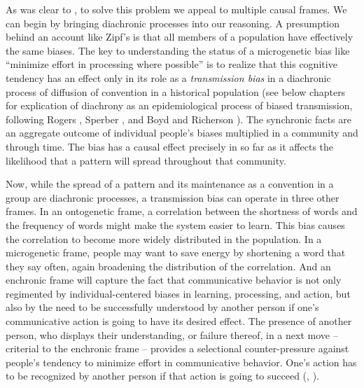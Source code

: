 As was clear to \citet{zipf_human_1949}, to solve this problem we appeal to 
multiple causal frames. We can begin by bringing diachronic processes 
into our reasoning. A presumption behind an account like Zipf's is 
that all members of a population have effectively the same biases. The key to understanding the status of a microgenetic bias like 
``minimize effort in processing where possible'' is to realize that this 
cognitive tendency has an effect only in its role as a \textit{transmission bias} in a diachronic process of diffusion of convention 
in a historical population (see below chapters for explication of 
diachrony as an epidemiological process of biased transmission, 
following Rogers \citeyear{rogers_diffusion_2003}, Sperber \citeyear{sperber_anthropology_1985}, and Boyd and Richerson \citeyear{boyd_culture_1985,boyd_origin_2005}). The synchronic facts are an aggregate outcome of individual people's biases multiplied in a community and through time. The bias has a 
causal effect precisely in so far as it affects the likelihood that a
pattern will spread throughout that community. 



Now, while the spread of a pattern and its maintenance as a convention in a group are diachronic processes, a transmission bias can operate in three other frames. In an ontogenetic frame, a correlation between the shortness of words and the frequency of words might make the system easier to learn. This bias causes the correlation to become more widely distributed in the population. In a microgenetic frame, people may want to save energy by shortening a word that they say often, again broadening the distribution of the correlation. And an enchronic frame will capture the fact that communicative behavior is not only regimented by individual-centered biases in learning, processing, and action, but also by the need to be successfully understood by another person if one's communicative action is going to have its desired effect. The presence of another person, who displays their understanding, or failure thereof, in a next move -- criterial to the enchronic frame -- provides a selectional counter-pressure against people's tendency to minimize effort in communicative behavior. One's action has to be recognized by another person if that action is going to succeed (\citealt[21]{zipf_human_1949}, \citealt[Chapter 9]{enfield_relationship_2013}).



